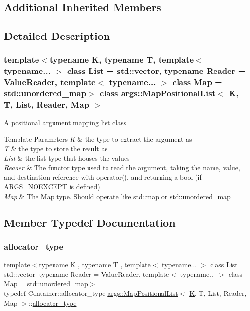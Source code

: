 \subsection*{Additional Inherited Members}


\subsection{Detailed Description}
\subsubsection*{template$<$typename K, typename T, template$<$ typename... $>$ class List = std\+::vector, typename Reader = Value\+Reader, template$<$ typename... $>$ class Map = std\+::unordered\+\_\+map$>$\newline
class args\+::\+Map\+Positional\+List$<$ K, T, List, Reader, Map $>$}

A positional argument mapping list class


\begin{DoxyTemplParams}{Template Parameters}
{\em K} & the type to extract the argument as \\
\hline
{\em T} & the type to store the result as \\
\hline
{\em List} & the list type that houses the values \\
\hline
{\em Reader} & The functor type used to read the argument, taking the name, value, and destination reference with operator(), and returning a bool (if A\+R\+G\+S\+\_\+\+N\+O\+E\+X\+C\+E\+PT is defined) \\
\hline
{\em Map} & The Map type. Should operate like std\+::map or std\+::unordered\+\_\+map \\
\hline
\end{DoxyTemplParams}


\subsection{Member Typedef Documentation}
\mbox{\label{classargs_1_1_map_positional_list_aa961fcc8eee61814bd1fb2b75f0235c1}} 
\subsubsection{\texorpdfstring{allocator\+\_\+type}{allocator\_type}}
{\footnotesize\ttfamily template$<$typename K , typename T , template$<$ typename... $>$ class List = std\+::vector, typename Reader  = Value\+Reader, template$<$ typename... $>$ class Map = std\+::unordered\+\_\+map$>$ \\
typedef Container\+::allocator\+\_\+type \hyperlink{classargs_1_1_map_positional_list}{args\+::\+Map\+Positional\+List}$<$ \hyperlink{cgal__test_8cpp_a891e241aa245ae63618f03737efba309}{K}, T, List, Reader, Map $>$\+::\hyperlink{classargs_1_1_map_positional_list_aa961fcc8eee61814bd1fb2b75f0235c1}{allocator\+\_\+type}}

